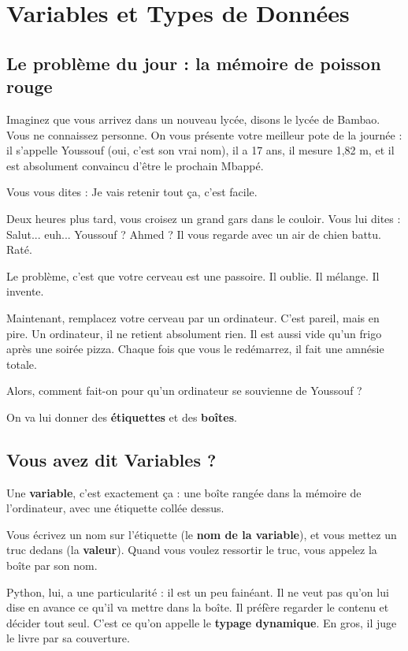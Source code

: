 \documentclass[12pt,a4paper]{article}
\begin{document}
	   \section{Variables et Types de Données}
	   
	   \subsection{Le problème du jour : la mémoire de poisson rouge}
	   
	   Imaginez que vous arrivez dans un nouveau lycée, disons le lycée de Bambao. Vous ne connaissez personne. On vous présente votre meilleur pote de la journée : il s'appelle \og Youssouf \fg (oui, c'est son vrai nom), il a 17 ans, il mesure 1,82 m, et il est absolument convaincu d'\^etre le prochain Mbappé.
	   
	   Vous vous dites : \og Je vais retenir tout ça, c'est facile. \fg
	   
	   Deux heures plus tard, vous croisez un grand gars dans le couloir. Vous lui dites : \og Salut... euh... Youssouf ? Ahmed ? \fg Il vous regarde avec un air de chien battu. Raté.
	   
	   Le problème, c'est que votre cerveau est une passoire. Il oublie. Il mélange. Il invente.
	   
	   Maintenant, remplacez votre cerveau par un ordinateur. C'est pareil, mais en pire. Un ordinateur, il ne retient absolument rien. Il est aussi vide qu'un frigo apr\`es une soirée pizza. Chaque fois que vous le redémarrez, il fait une amnésie totale.
	   
	   Alors, comment fait-on pour qu'un ordinateur se souvienne de \og Youssouf \fg ?
	   
	   On va lui donner des \textbf{étiquettes} et des \textbf{boîtes}.
	   
	   \subsection{Vous avez dit \og Variables \fg ?}
	   
	   Une \textbf{variable}, c'est exactement ça : une boîte rangée dans la mémoire de l'ordinateur, avec une étiquette collée dessus.
	   
	   Vous écrivez un nom sur l'étiquette (le \textbf{nom de la variable}), et vous mettez un truc dedans (la \textbf{valeur}). Quand vous voulez ressortir le truc, vous appelez la boîte par son nom.
	   
	   Python, lui, a une particularité : il est un peu fainéant. Il ne veut pas qu'on lui dise en avance ce qu'il va mettre dans la boîte. Il préfère regarder le contenu et décider tout seul. C'est ce qu'on appelle le \textbf{typage dynamique}. En gros, il juge le livre par sa couverture.
	   
\end{document}
